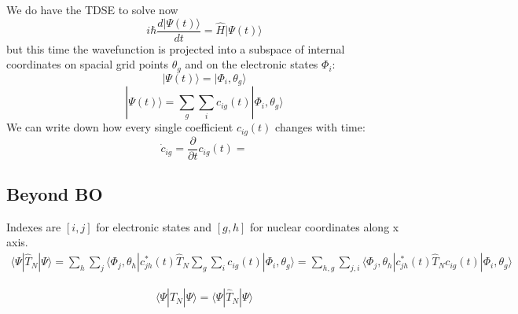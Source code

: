We do have the TDSE to solve now
\begin{equation}
i\hbar\dfrac{d|\Psi(t)\rangle}{dt} = \hat{H}|\Psi(t)\rangle
\end{equation}
but this time the wavefunction is projected into a subspace of internal coordinates on spacial grid points $\theta_g$ and on the electronic states $\Phi_i$:
\begin{equation}
|\Psi(t)\rangle = |\Phi_i,\theta_g\rangle
\end{equation}
\begin{equation}
|\Psi(t)\rangle = \sum_g \sum_i c_{ig}(t) |\Phi_i,\theta_g\rangle
\end{equation}
We can write down how every single coefficient $c_{ig}(t)$ changes with time:
\begin{equation}
\dot{c}_{ig}=\dfrac{\partial}{\partial t} c_{ig}(t) = 
\end{equation}

\subsection{Beyond BO}
Indexes are $[i,j]$ for electronic states and $[g,h]$ for nuclear coordinates along x axis.
\begin{multline}
         \langle \Psi | \hat{T}_{N}  | \Psi \rangle = 
         \sum_h \sum_j \langle \Phi_j,\theta_h | c^*_{jh}(t)  \hat{T}_{N}   \sum_g \sum_i c_{ig}(t) |\Phi_i,\theta_g \rangle =  
         \sum_{h,g} \sum_{j,i} \langle \Phi_j,\theta_h | c^*_{jh}(t)  \hat{T}_{N}  c_{ig}(t) |\Phi_i,\theta_g \rangle
\end{multline}

\begin{multline}
\langle \Psi | \hat{T}_{N}  | \Psi \rangle = \langle \Psi | \hat{T}_{N}  | \Psi \rangle
\end{multline}


